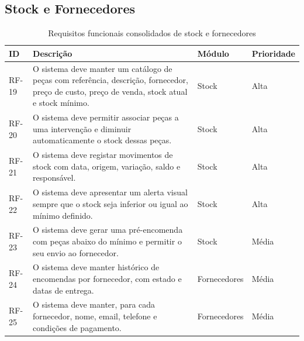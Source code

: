 \documentclass[a4paper,12pt]{scrreprt}
\begin{document}
        \subsection{Stock e Fornecedores}
        \begin{table}[H]
            \centering
            \small
            \begin{tabular}{|p{1.4cm}|p{8.9cm}|p{2.5cm}|p{2.1cm}|}
                \hline
                \rowcolor{gray!20!white}
                \textbf{ID} & \textbf{Descrição} & \textbf{Módulo} & \textbf{Prioridade} \\
                \hline
                RF-19 & O sistema deve manter um catálogo de peças com referência, descrição, fornecedor, preço de custo, preço de venda, stock atual e stock mínimo. & Stock & Alta \\
                \hline
                RF-20 & O sistema deve permitir associar peças a uma intervenção e diminuir automaticamente o stock dessas peças. & Stock & Alta \\
                \hline
                RF-21 & O sistema deve registar movimentos de stock com data, origem, variação, saldo e responsável. & Stock & Alta \\
                \hline
                RF-22 & O sistema deve apresentar um alerta visual sempre que o stock seja inferior ou igual ao mínimo definido. & Stock & Alta \\
                \hline
                RF-23 & O sistema deve gerar uma pré-encomenda com peças abaixo do mínimo e permitir o seu envio ao fornecedor. & Stock & Média \\
                \hline
                RF-24 & O sistema deve manter histórico de encomendas por fornecedor, com estado e datas de entrega. & Fornecedores & Média \\
                \hline
                RF-25 & O sistema deve manter, para cada fornecedor, nome, email, telefone e condições de pagamento. & Fornecedores & Média \\
                \hline
            \end{tabular}
            \caption{Requisitos funcionais consolidados de stock e fornecedores}
        \end{table}
\end{document}

